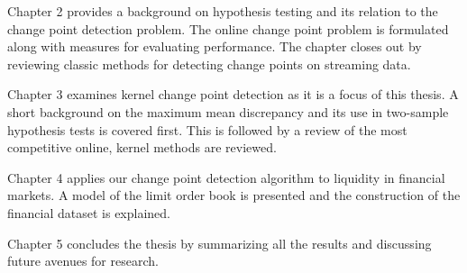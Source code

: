 Chapter 2 provides a background on hypothesis testing and its relation to the change point detection problem. The online change point problem is formulated along with measures for evaluating performance. The chapter closes out by reviewing classic methods for detecting change points on streaming data.

Chapter 3 examines kernel change point detection as it is a focus of this thesis. A short background on the maximum mean discrepancy and its use in two-sample hypothesis tests is covered first. This is followed by a review of the most competitive online, kernel methods are reviewed.

Chapter 4 applies our change point detection algorithm to liquidity in financial markets. A model of the limit order book is presented and the construction of the financial dataset is explained.

Chapter 5 concludes the thesis by summarizing all the results and discussing future avenues for research.